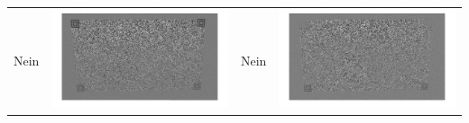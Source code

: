 \begin{table}[htb]
\begin{tabular}{|p{2cm}<{\centering}|c|p{2cm}<{\centering}|c|}
	Nein & \includegraphics[scale=0.15]{images/3_Ersteverfahren/Differenzbild/2weis.pdf}& Nein & \includegraphics[scale=0.15]{images/3_Ersteverfahren/Differenzbild/3halfweis.pdf}\\

\end{tabular}
\end{table}

